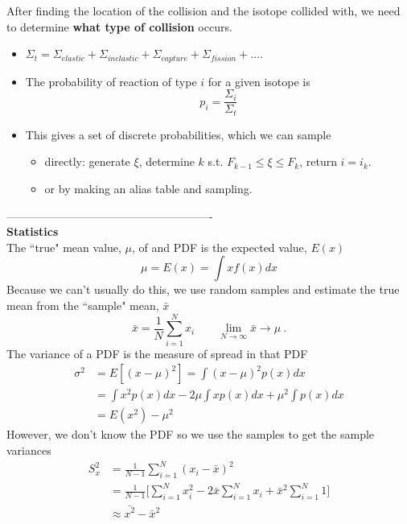 \documentclass[12pt]{article}
\begin{document}
After finding the location of the collision and the isotope collided with, we need to determine \textbf{what type of collision} occurs. 
%
\begin{itemize}
\item $\Sigma_t = \Sigma_{elastic} + \Sigma_{inelastic} + \Sigma_{capture} + \Sigma_{fission} + \dots$.
%
\item The probability of reaction of type $i$ for a given isotope is 
\[p_i = \frac{\Sigma_i}{\Sigma_t}\]
%
\item This gives a set of discrete probabilities, which we can sample 
\begin{itemize}
\item directly: generate $\xi$, determine $k$ s.t. $F_{k-1} \leq \xi \le F_k$, return $i = i_k$.
%
\item or by making an alias table and sampling.
\end{itemize}
\end{itemize}

-------------------------------------------------------\\
\textbf{Statistics}\\
The ``true" mean value, $\mu$, of and PDF is the expected value, $E(x)$
\[
\mu = E(x) = \int x f(x) dx
\]
Because we can't usually do this, we use random samples and estimate the true mean from the ``sample" mean, $\bar{x}$
\[
\bar{x} = \frac{1}{N}\sum_{i=1}^N x_i \qquad \lim_{N \to \infty} \bar{x} \rightarrow \mu\:.
\]
The variance of a PDF is the measure of spread in that PDF
\begin{align*}
\sigma^2 &= E[(x - \mu)^2] = \int (x - \mu)^2 p(x) dx \\
&= \int x^2 p(x) dx - 2 \mu \int x p(x) dx + \mu^2 \int p(x) dx\\
&= E(x^2) - \mu^2
\end{align*}
%
However, we don't know the PDF so we use the samples to get the sample variances
\begin{align*}
S_x^2 &= \frac{1}{N-1}\sum_{i=1}^N (x_i - \bar{x})^2 \\
&= \frac{1}{N-1} \biggl[\sum_{i=1}^N x_i^2 - 2 \bar{x}\sum_{i=1}^N x_i + \bar{x}^2 \sum_{i=1}^N 1 \biggr] \\
&\approx \bar{x^2} - \bar{x}^2
\end{align*}
\end{document}
